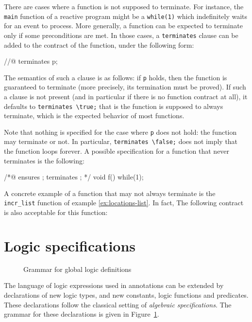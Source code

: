 There are cases where a function is not supposed to terminate. For
instance, the \lstinline|main| function of a reactive program might be a
\lstinline|while(1)| which indefinitely waits for an event to process. More
generally, a function can be expected to terminate only if some
preconditions are met. In those cases, a \lstinline|terminates| clause can
be added to the contract of the function, under the following form:

\begin{listing-nonumber}
//@ terminates p;
\end{listing-nonumber}

The semantics of such a clause is as follows: if \lstinline|p| holds, then the
function is guaranteed to terminate (more precisely, its
termination must be proved). If such a clause is not present (and in
particular if there is no function contract at all), it
defaults to \lstinline|terminates \true;| that is the function is supposed
to always terminate, which is the expected behavior of most
functions.

Note that nothing is specified for the case where \lstinline|p| does not hold:
the function may terminate or not. In particular,
\lstinline|terminates \false;| does not imply that the function loops
forever. A possible specification for a function that never terminates
is the following:
\begin{listing}{1}
/*@ ensures \false;
    terminates \false;
*/
void f() { while(1); }
\end{listing}

\begin{example}
  A concrete example of a function that may not always terminate is
  the \lstinline|incr_list| function of example \ref{ex:locations-list}. In
  fact, The following contract is also acceptable for this function:
\end{example}

\section{Logic specifications}
\label{sec:logicspec}
\begin{figure}[t]
  \begin{cadre}\vfill 
    \vfill\end{cadre}
  \caption{Grammar for global logic definitions}
\label{fig:gram:logic}
\end{figure}
The language of logic expressions used in annotations can be extended
by declarations of new logic types, and new constants, logic functions
and predicates. These declarations follow the classical setting of
\emph{algebraic specifications}.
The grammar for these declarations is given in Figure~\ref{fig:gram:logic}.

